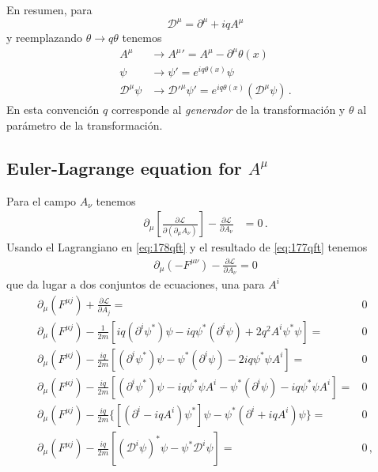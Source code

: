 En resumen, para 
\begin{equation}
  \mathcal{D}^\mu=\partial^\mu+iqA^\mu
\end{equation}
y reemplazando $\theta\to q\theta$ tenemos
\begin{align}
   A^\mu&\to{A^\mu}'=A^\mu-\partial^\mu\theta(x)\nonumber\\
   \psi&\to \psi'=e^{iq\theta(x)}\psi\nonumber\\
  \mathcal{D}^\mu\psi&\to {\mathcal{D}'}^\mu\psi'=e^{iq\theta(x)}(\mathcal{D}^\mu\psi)\,.
\end{align}
En esta convención $q$ corresponde al \emph{generador} de la transformación y $\theta$ al parámetro de la transformación.

\subsection{Euler-Lagrange equation for $A^\mu$}
Para el campo $A_\nu$ tenemos
\begin{align}
    \partial_\mu\left[
    \frac{\partial\mathcal{L}}{\partial(\partial_\mu A_\nu)}  
  \right]-\frac{\partial\mathcal{L}}{\partial A_\nu}&=0\,.
\end{align}
Usando el Lagrangiano en \eqref{eq:178qft}  y el resultado de \eqref{eq:177qft}
tenemos
\begin{align}
  \partial_\mu(-F^{\mu\nu})-\frac{\partial\mathcal{L}}{\partial A_\nu}=0\nonumber
\end{align}
que da lugar a dos conjuntos de ecuaciones, una para $A^i$
\begin{align}
  \partial_\mu(F^{\mu j})+\frac{\partial\mathcal{L}}{\partial A_j}=&0\nonumber\\
  \partial_\mu(F^{\mu j})-\frac{1}{2m}[i q(\partial^i\psi^*)\psi -i q \psi^*(\partial^i\psi)+2q^2 A^i\psi^*\psi]=&0\nonumber\\
  \partial_\mu(F^{\mu j})-\frac{i q}{2m}[(\partial^i\psi^*)\psi - \psi^*(\partial^i\psi)-2iq \psi^*\psi A^i]=&0\nonumber\\
  \partial_\mu(F^{\mu j})-\frac{i q}{2m}[(\partial^i\psi^*)\psi -iq \psi^*\psi A^i- \psi^*(\partial^i\psi)-iq \psi^*\psi A^i]=&0\nonumber\\
  \partial_\mu(F^{\mu j})-\frac{i q}{2m}\{[(\partial^i-iqA^i)\psi^*]\psi -\psi^*(\partial^i+iqA^i)\psi\} =&0\nonumber\\
  \partial_\mu(F^{\mu j})-\frac{i q}{2m}[(\mathcal{D}^i\psi)^*\psi -\psi^*\mathcal{D}^i\psi] =&0\,,
\end{align}
